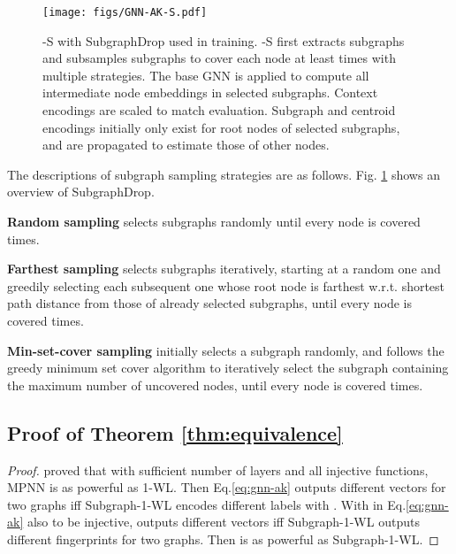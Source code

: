 \begin{figure}[h]
    \centering
    \texttt{[image: figs/GNN-AK-S.pdf]}
    \vspace{-0.15in}
    \caption{\method-S with SubgraphDrop used in training. \method-S first extracts subgraphs and subsamples  subgraphs to cover each node at least  times with multiple strategies. The base GNN is applied to compute all intermediate node embeddings in selected subgraphs. Context encodings are scaled to match evaluation. Subgraph and centroid encodings initially only exist for  root nodes of selected subgraphs, and are propagated to estimate those of other nodes.}
    \label{fig:sampling}
\end{figure}

The descriptions of subgraph sampling strategies are as follows. Fig. \ref{fig:sampling} shows an overview of \textsf{\small{SubgraphDrop}}.
\begin{compactitem}[\textbullet]
    \item {\bf Random sampling} selects subgraphs randomly until every node is covered  times. \item {\bf Farthest sampling} selects subgraphs iteratively, starting at a random one and greedily selecting each subsequent one whose root node is farthest w.r.t. shortest path distance from those of already selected subgraphs, 
until every node is covered  times. \item {\bf Min-set-cover sampling}  initially selects a subgraph randomly, and follows the greedy minimum set cover algorithm to iteratively select the subgraph containing the maximum number of uncovered nodes, until every node is covered  times. \end{compactitem}



\subsection{Proof of Theorem \ref{thm:equivalence}}\label{apdx:proof-of-equi}
\begin{proof}
\citep{xu2018powerful} proved that with sufficient number of layers and all injective functions, MPNN is as powerful as 1-WL. Then Eq.\ref{eq:gnn-ak} outputs different vectors for two graphs iff Subgraph-1-WL encodes different labels with . With  in Eq.\ref{eq:gnn-ak} also to be injective,  outputs different vectors iff Subgraph-1-WL outputs different fingerprints for two graphs. Then  is as powerful as Subgraph-1-WL.
\end{proof}

